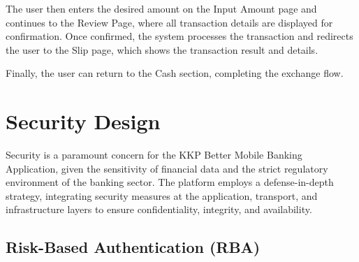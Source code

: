 \documentclass[12pt,oneside,openright,a4paper]{cpe-english-project}
\begin{document}
The user then enters the desired amount on the Input Amount page and
continues to the Review Page, where all transaction details are
displayed for confirmation. Once confirmed, the system processes the
transaction and redirects the user to the Slip page, which shows the
transaction result and details.

Finally, the user can return to the Cash section, completing the
exchange flow.





\section{Security Design}

Security is a paramount concern for the KKP Better Mobile Banking
Application, given the sensitivity of financial data and the strict
regulatory environment of the banking sector. The platform employs a
defense-in-depth strategy, integrating security measures at the
application, transport, and infrastructure layers to ensure
confidentiality, integrity, and availability.

\subsection{Risk-Based Authentication (RBA)}
\end{document}

